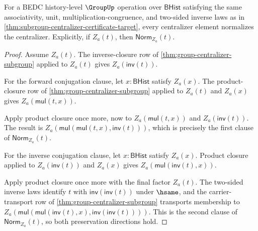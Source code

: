 \begin{theorem}
\label{thm:subgroup-centralizer-self-normalizer}
For a BEDC history-level $\GroupUp$ operation over $\mathsf{BHist}$ satisfying
the same associativity, unit, multiplication-congruence, and two-sided inverse
laws as in \autoref{thm:subgroup-centralizer-certificate-target}, every
centralizer element normalizes the centralizer. Explicitly, if $Z_a(t)$, then
$\mathsf{Norm}_{Z_a}(t)$.
\end{theorem}
\begin{proof}
Assume $Z_a(t)$. The inverse-closure row of
\autoref{thm:group-centralizer-subgroup} applied to $Z_a(t)$ gives
$Z_a(\mathsf{inv}(t))$.

For the forward conjugation clause, let $x:\mathsf{BHist}$ satisfy $Z_a(x)$.
The product-closure row of \autoref{thm:group-centralizer-subgroup} applied to
$Z_a(t)$ and $Z_a(x)$ gives $Z_a(\mathsf{mul}(t,x))$.

Apply product closure once more, now to $Z_a(\mathsf{mul}(t,x))$ and
$Z_a(\mathsf{inv}(t))$. The result is
$Z_a(\mathsf{mul}(\mathsf{mul}(t,x),\mathsf{inv}(t)))$, which is precisely
the first clause of $\mathsf{Norm}_{Z_a}(t)$.

For the inverse conjugation clause, let $x:\mathsf{BHist}$ satisfy $Z_a(x)$.
Product closure applied to $Z_a(\mathsf{inv}(t))$ and $Z_a(x)$ gives
$Z_a(\mathsf{mul}(\mathsf{inv}(t),x))$.

Apply product closure once more with the final factor $Z_a(t)$. The two-sided
inverse laws identify $t$ with $\mathsf{inv}(\mathsf{inv}(t))$ under $\hsame$,
and the carrier-transport row of \autoref{thm:group-centralizer-subgroup}
transports membership to
$Z_a(\mathsf{mul}(\mathsf{mul}(\mathsf{inv}(t),x),
\mathsf{inv}(\mathsf{inv}(t))))$. This is the second clause of
$\mathsf{Norm}_{Z_a}(t)$, so both preservation directions hold.
\end{proof}

